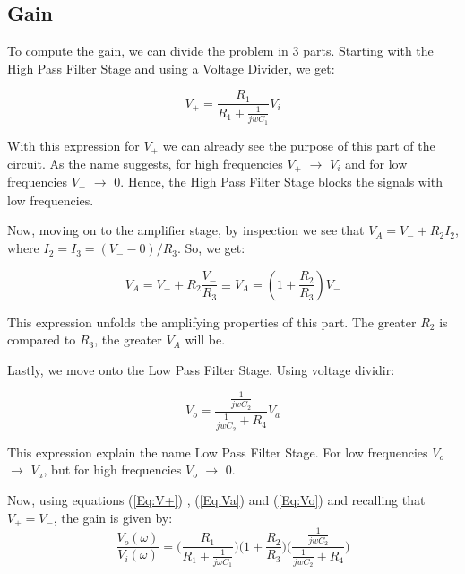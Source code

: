 \subsection{Gain}

To compute the gain, we can divide the problem in 3 parts. Starting with the High Pass Filter Stage and using a Voltage Divider, we get:

\begin{equation}
    V_{+}=\frac{R_1}{R_1+\frac{1}{jwC_1}}V_i
    \label{Eq:V+}
\end{equation}

With this expression for $V_{+}$ we can already see the purpose of this part of the circuit. As the name suggests, for high frequencies $V_{+}$ $\to$ $V_i$ and for low frequencies $V_{+}$ $\to$ $0$.
Hence, the High Pass Filter Stage blocks the signals with low frequencies.

Now, moving on to the amplifier stage, by inspection we see that $V_A=V_{-}+R_2I_2$, where $I_2=I_3=(V_{-}-0)/R_3$. So, we get:

\begin{equation}
    V_A=V_{-}+R_2\frac{V_{-}}{R_3}  \equiv V_A = (1+\frac{R_2}{R_3})V_{-}
    \label{Eq:Va}
\end{equation}

This expression unfolds the amplifying properties of this part. The greater $R_2$ is compared to $R_3$, the greater $V_A$ will be. \par

Lastly, we move onto the Low Pass Filter Stage. Using voltage dividir:

\begin{equation}
    V_o=\frac{\frac{1}{jwC_2}}{\frac{1}{jwC_2}+R_4}V_a
    \label{Eq:Vo}
\end{equation}

This expression explain the name Low Pass Filter Stage. For low frequencies $V_o$ $\to$ $V_a$, but for high frequencies $V_o$ $\to$ $0$.\par

Now, using equations (\ref{Eq:V+}) , (\ref{Eq:Va}) and (\ref{Eq:Vo}) and recalling that $V_{+}=V_{-}$, the gain is given by:
\begin{equation}
    \frac{V_o(\omega)}{V_i(\omega)}=\Bigg( \frac{R_1}{R_1+\frac{1}{j\omega C_1}}   \Bigg) \Bigg( 1+\frac{R_2}{R_3}  \Bigg) \Bigg( \frac{\frac{1}{jwC_2}}{\frac{1}{jwC_2}+R_4} \Bigg)
\end{equation}


